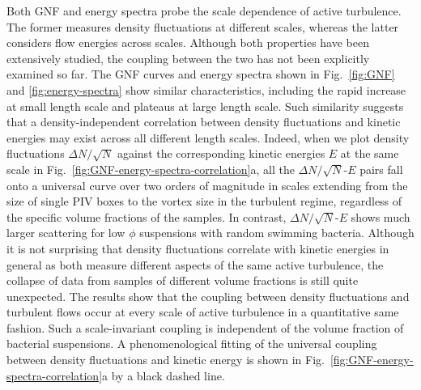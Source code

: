 \documentclass[twocolumn,aps,prx,amsmath,amssymb,longbibliography]{revtex4-2}
\begin{document}
Both GNF and energy spectra probe the scale dependence of active turbulence. The former measures density fluctuations at different scales, whereas the latter considers flow energies across scales. Although both properties have been extensively studied, the coupling between the two has not been explicitly examined so far.
The GNF curves and energy spectra shown in Fig.~\ref{fig:GNF} and \ref{fig:energy-spectra} show similar characteristics, including the rapid increase at small length scale and plateaus at large length scale. Such similarity suggests that a density-independent correlation between density fluctuations and kinetic energies may exist across all different length scales.
Indeed, when we plot density fluctuations $\Delta N/\sqrt N$ against the corresponding kinetic energies $E$ at the same scale in Fig.~\ref{fig:GNF-energy-spectra-correlation}a, all the $\Delta N/\sqrt N$-$E$ pairs fall onto a universal curve over two orders of magnitude in scales extending from the size of single PIV boxes to the vortex size in the turbulent regime, regardless of the specific volume fractions of the samples.
In contrast, $\Delta N/\sqrt N$-$E$ shows much larger scattering for low $\phi$ suspensions with random swimming bacteria.
Although it is not surprising that density fluctuations correlate with kinetic energies in general as both measure different aspects of the same active turbulence, the collapse of data from samples of different volume fractions
is still quite unexpected.
The results show that the coupling between density fluctuations and turbulent flows occur at every scale of active turbulence in a quantitative same fashion. Such a scale-invariant coupling is independent of the volume fraction of bacterial suspensions. A phenomenological fitting of the universal coupling between density fluctuations and kinetic energy is shown in Fig.~\ref{fig:GNF-energy-spectra-correlation}a by a black dashed line.
\end{document}
